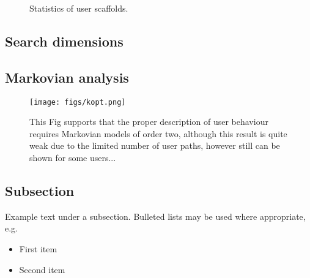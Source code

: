 \documentclass[fleqn,10pt]{wlscirep}
\begin{document}
\begin{figure}[H]
\begin{tikzpicture}
    \end{tikzpicture}
  \caption{Statistics of user scaffolds.}
  \label{fig:bstats}
\end{figure}

\subsection*{Search dimensions}
\subsection*{Markovian analysis}

\begin{figure}[H]
\centering
\texttt{[image: figs/kopt.png]}
\caption{This Fig supports that the proper description of user behaviour requires Markovian models of order two, although this result is quite weak due to the limited number of user paths, however still can be shown for some users... }
\label{fig:kopt}
\end{figure}




\subsection*{Subsection}

Example text under a subsection. Bulleted lists may be used where appropriate, e.g.

\begin{itemize}
\item First item
\item Second item
\end{itemize}
\end{document}
